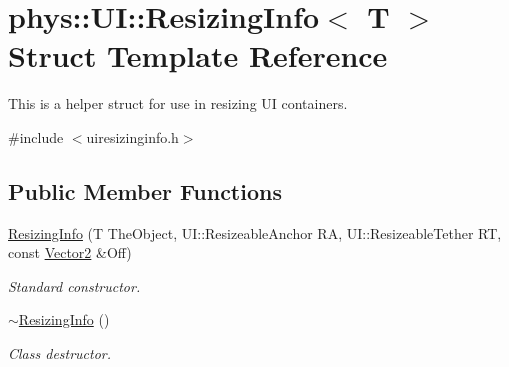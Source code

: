 \hypertarget{structphys_1_1UI_1_1ResizingInfo}{
\section{phys::UI::ResizingInfo$<$ T $>$ Struct Template Reference}
\label{d0/d08/structphys_1_1UI_1_1ResizingInfo}
}


This is a helper struct for use in resizing UI containers.  




{\ttfamily \#include $<$uiresizinginfo.h$>$}

\subsection*{Public Member Functions}
\begin{DoxyCompactItemize}
\item 
\hyperlink{structphys_1_1UI_1_1ResizingInfo_ae1a05f302e6e8f63773be6daf945f85d}{ResizingInfo} (T TheObject, UI::ResizeableAnchor RA, UI::ResizeableTether RT, const \hyperlink{classphys_1_1Vector2}{Vector2} \&Off)
\begin{DoxyCompactList}\small\item\em Standard constructor. \item\end{DoxyCompactList}\item 
\hypertarget{structphys_1_1UI_1_1ResizingInfo_a4443b66121aff4be05676e11a1bbe987}{
\hyperlink{structphys_1_1UI_1_1ResizingInfo_a4443b66121aff4be05676e11a1bbe987}{$\sim$ResizingInfo} ()}
\label{d0/d08/structphys_1_1UI_1_1ResizingInfo_a4443b66121aff4be05676e11a1bbe987}

\begin{DoxyCompactList}\small\item\em Class destructor. \item\end{DoxyCompactList}\end{DoxyCompactItemize}
